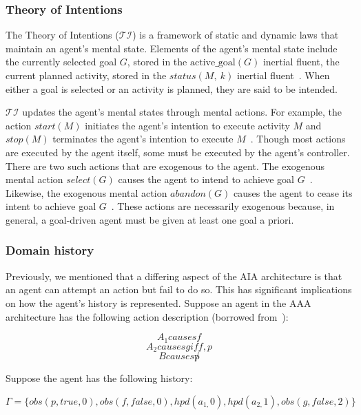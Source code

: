 \subsubsection{Theory of Intentions}
\label{subsubsec:theory_of_intentions}

The Theory of Intentions ($\mathcal{TI}$) is a framework of static and dynamic laws that maintain an agent's mental state.
Elements of the agent's mental state include the currently selected goal $G$, stored in the $\mathrm{active\_goal}\left(G\right)$ inertial fluent, the current planned activity, stored in the $status(M,\ k)$ inertial fluent~\cite{blount_towards_2014}.
When either a goal is selected or an activity is planned, they are said to be intended.

$\mathcal{TI}$ updates the agent's mental states through mental actions.
For example, the action $start(M)$ initiates the agent's intention to execute activity $M$ and $stop(M)$ terminates the agent's intention to execute $M$~\cite{blount_towards_2014}.
Though most actions are executed by the agent itself, some must be executed by the agent's controller.
There are two such actions that are exogenous to the agent.
The exogenous mental action $select(G)$ causes the agent to intend to achieve goal $G$~\cite{blount_towards_2014}.
Likewise, the exogenous mental action $abandon(G)$ causes the agent to cease its intent to achieve goal $G$~\cite{blount_towards_2014}.
These actions are necessarily exogenous because, in general, a goal-driven agent must be given at least one goal a priori.

\subsubsection{Domain history}
\label{subsubsec:domain_history}

Previously, we mentioned that a differing aspect of the AIA architecture is that an agent can attempt an action but fail to do so.
This has significant implications on how the agent's history is represented.
Suppose an agent in the AAA architecture has the following action description (borrowed from~\cite{blount_towards_2014}):

$$
A_1 causes f
$$
$$
A_2 causes g if f, p
$$
$$
B causes \not p
$$

Suppose the agent has the following history:

$$
\Gamma=\{obs\left(p,true,0\right),obs\left(f,false,0\right),hpd\left(a_{1,}0\right),hpd\left(a_{2,}1\right),obs\left(g,false,2\right)\}
$$

